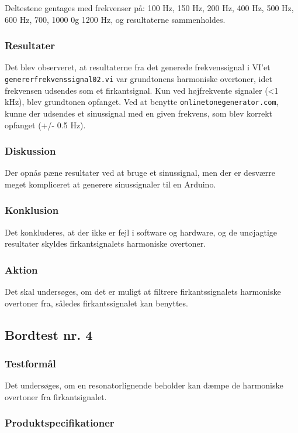 			Deltestene gentages med frekvenser på: 100 Hz, 150 Hz, 200 Hz, 400 Hz, 500 Hz, 600 Hz, 700, 1000 0g 1200 Hz, og resultaterne sammenholdes. 
			
			\subsubsection{Resultater}
			 Det blev observeret, at resultaterne fra det generede frekvenssignal i VI'et \texttt{genererfrekvenssignal02.vi} var grundtonens harmoniske overtoner, idet frekvensen udsendes som et firkantsignal. Kun ved højfrekvente signaler (<1 kHz), blev grundtonen opfanget. 
			 Ved at benytte \texttt{onlinetonegenerator.com}, kunne der udsendes et sinussignal med en given frekvens, som blev korrekt opfanget (+/- 0.5 Hz).     
			\subsubsection{Diskussion}
			Der opnås pæne resultater ved at bruge et sinussignal, men der er desværre meget kompliceret at generere sinussignaler til en Arduino.   
			\subsubsection{Konklusion}
			Det konkluderes, at der ikke er fejl i software og hardware, og de unøjagtige resultater skyldes firkantsignalets harmoniske overtoner.  
			\subsubsection{Aktion}
			Det skal undersøges, om det er muligt at filtrere firkantssignalets harmoniske overtoner fra, således firkantssignalet kan benyttes. 
		
		\subsection{Bordtest nr. 4} %
		\subsubsection{Testformål}
		Det undersøges, om en resonatorlignende beholder kan dæmpe de harmoniske overtoner fra firkantsignalet. 
		
		\subsubsection{Produktspecifikationer}
		

